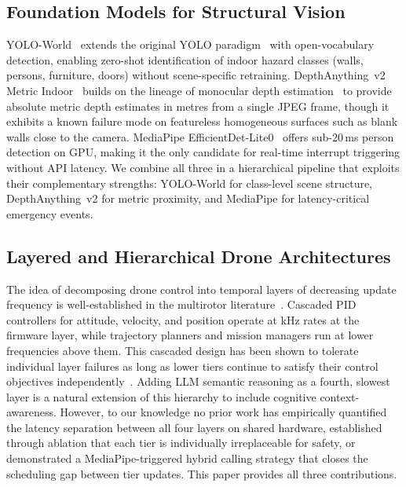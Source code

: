 \documentclass[journal]{IEEEtran}
\begin{document}
\subsection{Foundation Models for Structural Vision}

YOLO-World~\cite{cheng2024yoloworld} extends the original YOLO
paradigm~\cite{redmon2016yolo} with open-vocabulary detection, enabling
zero-shot identification of indoor hazard classes (walls, persons, furniture,
doors) without scene-specific retraining.
DepthAnything~v2 Metric Indoor~\cite{yang2024depthanythingv2} builds on
the lineage of monocular depth estimation~\cite{ranftl2020midas} to provide
absolute metric depth estimates in metres from a single JPEG frame, though
it exhibits a known failure mode on featureless homogeneous surfaces such
as blank walls close to the camera.
MediaPipe EfficientDet-Lite0~\cite{tan2020efficientdet,lugaresi2019mediapipe}
offers sub-20\,ms person detection on GPU, making it the only candidate for
real-time interrupt triggering without API latency.
We combine all three in a hierarchical pipeline that exploits their
complementary strengths: YOLO-World for class-level scene structure,
DepthAnything~v2 for metric proximity, and MediaPipe for latency-critical
emergency events.

\subsection{Layered and Hierarchical Drone Architectures}

The idea of decomposing drone control into temporal layers of decreasing
update frequency is well-established in the multirotor
literature~\cite{mahony2012multirotor,mellinger2011minimum}.
Cascaded PID controllers for attitude, velocity, and position operate at
kHz rates at the firmware layer, while trajectory planners and
mission managers run at lower frequencies above them.
This cascaded design has been shown to tolerate individual layer failures
as long as lower tiers continue to satisfy their control objectives
independently~\cite{mahony2012multirotor}.
Adding LLM semantic reasoning as a fourth, slowest layer is a natural
extension of this hierarchy to include cognitive context-awareness.
However, to our knowledge no prior work has empirically quantified the
latency separation between all four layers on shared hardware, established
through ablation that each tier is individually irreplaceable for safety,
or demonstrated a MediaPipe-triggered hybrid calling strategy that closes
the scheduling gap between tier updates.
This paper provides all three contributions.
\end{document}
